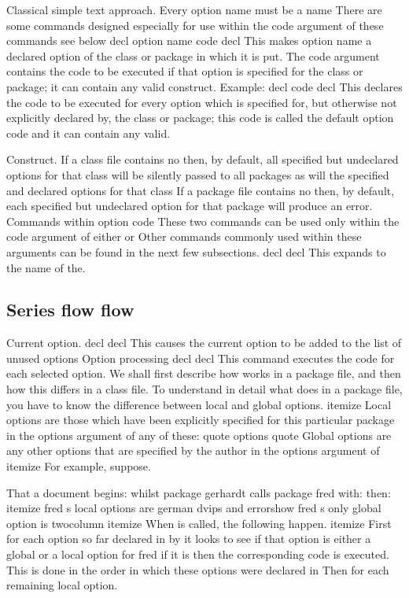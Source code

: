 \documentclass{article}
\begin{document}
Classical simple text approach. Every option name must be a name There are some commands designed especially for use within the code argument of these commands see below decl option name code decl This makes option name a declared option of the class or package in which it is put. The code argument contains the code to be executed if that option is specified for the class or package; it can contain any valid construct. Example: decl code decl This declares the code to be executed for every option which is specified for, but otherwise not explicitly declared by, the class or package; this code is called the default option code and it can contain any valid.

Construct. If a class file contains no then, by default, all specified but undeclared options for that class will be silently passed to all packages as will the specified and declared options for that class If a package file contains no then, by default, each specified but undeclared option for that package will produce an error. Commands within option code These two commands can be used only within the code argument of either or Other commands commonly used within these arguments can be found in the next few subsections. decl decl This expands to the name of the.

\subsection{Series flow flow}
Current option. decl decl This causes the current option to be added to the list of unused options Option processing decl decl This command executes the code for each selected option. We shall first describe how works in a package file, and then how this differs in a class file. To understand in detail what does in a package file, you have to know the difference between local and global options. itemize Local options are those which have been explicitly specified for this particular package in the options argument of any of these: quote options quote Global options are any other options that are specified by the author in the options argument of itemize For example, suppose.

That a document begins: whilst package gerhardt calls package fred with: then: itemize fred s local options are german dvips and errorshow fred s only global option is twocolumn itemize When is called, the following happen. itemize First for each option so far declared in by it looks to see if that option is either a global or a local option for fred if it is then the corresponding code is executed. This is done in the order in which these options were declared in Then for each remaining local option.
\end{document}
